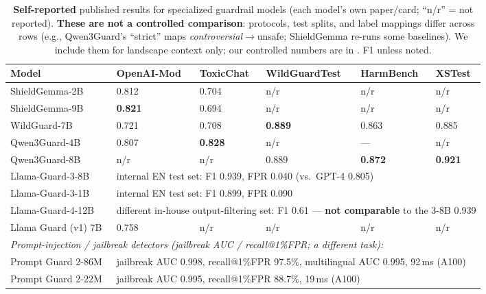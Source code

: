 \begin{table}[t]
\small\centering
\setlength{\tabcolsep}{4pt}
\caption{\textbf{Self-reported} published results for specialized guardrail models (each model's own paper/card; ``n/r'' = not reported). \textbf{These are not a controlled comparison}: protocols, test splits, and label mappings differ across rows (e.g., Qwen3Guard's ``strict'' maps \emph{controversial}$\to$unsafe; ShieldGemma re-runs some baselines). We include them for landscape context only; our controlled numbers are in . F1 unless noted.}
\label{tab:guardrail-published}
\begin{tabular}{llllll}
\toprule
Model & OpenAI-Mod & ToxicChat & WildGuardTest & HarmBench & XSTest \\
\midrule
ShieldGemma-2B~\cite{zeng2024shieldgemma} & 0.812 & 0.704 & n/r & n/r & n/r \\
ShieldGemma-9B~\cite{zeng2024shieldgemma} & \textbf{0.821} & 0.694 & n/r & n/r & n/r \\
WildGuard-7B~\cite{han2024wildguard} & 0.721 & 0.708 & \textbf{0.889} & 0.863 & 0.885 \\
Qwen3Guard-4B~\cite{qwen3guard2025} & 0.807 & \textbf{0.828} & n/r & --- & n/r \\
Qwen3Guard-8B~\cite{qwen3guard2025} & n/r & n/r & 0.889 & \textbf{0.872} & \textbf{0.921} \\
Llama-Guard-3-8B~\cite{meta2024llamaguard3_8b} & \multicolumn{5}{l}{internal EN test set: F1 0.939, FPR 0.040 (vs.\ GPT-4 0.805)} \\
Llama-Guard-3-1B~\cite{meta2024llamaguard3_1b} & \multicolumn{5}{l}{internal EN test set: F1 0.899, FPR 0.090} \\
Llama-Guard-4-12B~\cite{meta2025llamaguard4} & \multicolumn{5}{l}{different in-house output-filtering set: F1 0.61 --- \textbf{not comparable} to the 3-8B 0.939} \\
Llama Guard (v1) 7B~\cite{inan2023llamaguard} & 0.758 & n/r & n/r & n/r & n/r \\
\midrule
\multicolumn{6}{l}{\emph{Prompt-injection / jailbreak detectors (jailbreak AUC / recall@1\%FPR; a different task):}} \\
Prompt Guard 2-86M~\cite{meta2025promptguard2_86m} & \multicolumn{5}{l}{jailbreak AUC 0.998, recall@1\%FPR 97.5\%, multilingual AUC 0.995, 92\,ms (A100)} \\
Prompt Guard 2-22M~\cite{meta2025promptguard2_22m} & \multicolumn{5}{l}{jailbreak AUC 0.995, recall@1\%FPR 88.7\%, 19\,ms (A100)} \\
\bottomrule
\end{tabular}
\end{table}


